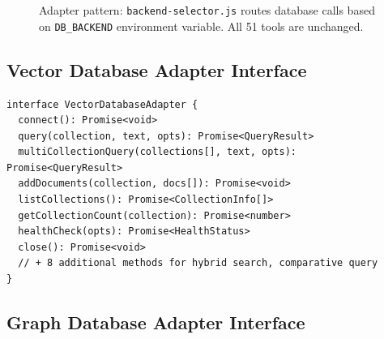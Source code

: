 \documentclass[11pt,letterpaper]{article}
\begin{document}
\begin{figure}[H]
\caption{Adapter pattern: \texttt{backend-selector.js} routes database calls
based on \texttt{DB\_BACKEND} environment variable. All 51 tools are unchanged.}
\label{fig:adapter-pattern}
\end{figure}

\subsection{Vector Database Adapter Interface}

\begin{lstlisting}[caption={VectorDatabaseAdapter interface (16 methods).}]
interface VectorDatabaseAdapter {
  connect(): Promise<void>
  query(collection, text, opts): Promise<QueryResult>
  multiCollectionQuery(collections[], text, opts): Promise<QueryResult>
  addDocuments(collection, docs[]): Promise<void>
  listCollections(): Promise<CollectionInfo[]>
  getCollectionCount(collection): Promise<number>
  healthCheck(opts): Promise<HealthStatus>
  close(): Promise<void>
  // + 8 additional methods for hybrid search, comparative query
}
\end{lstlisting}

\subsection{Graph Database Adapter Interface}
\end{document}
